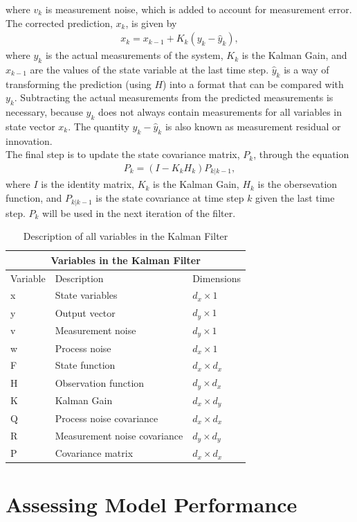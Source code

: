 \begin{enumerate}
    where $v_k$ is measurement noise, which is added to account for measurement error.
    The corrected prediction, $x_k$, is given by
    \begin{align*} 
        x_k = x_{k - 1} + K_k(y_k - \hat y_{k}),
    \end{align*}
   where  $y_k$ is the actual measurements of the system, $K_k$ is the Kalman Gain, and $x_{k-1}$ are the values of the state variable at the last time step. $\hat y_k$ is a way of transforming the prediction (using $H$) into a format that can be compared with $y_k$. Subtracting the actual measurements from the predicted measurements is necessary, because $y_k$ does not always contain measurements for all variables in state vector $x_k$. The quantity $y_k - \hat y_{k}$ is also known as measurement residual or innovation.  \\
   
      The final step is to update the state covariance matrix, $P_k $, through the equation
    \begin{align*} 
        P_k = (I - K_k H_k) P_{k | k-1},
    \end{align*}
    where $I$ is the identity matrix, $K_k$ is the Kalman Gain, $H_k$ is the obersevation function, and $P_{k|k-1}$ is the state covariance at time step $k$ given the last time step. $ P_k $ will be used in the next iteration of the filter.
\end{enumerate} 


\newpage

\begin{center}
\begin{table}
\centering
\caption{Description of all variables in the Kalman Filter} \label{tab:sometab}
\begin{tabular}{ |p{2cm}||p{5cm}|p{2cm}| }
    \hline
    \multicolumn{3}{|c|}{Variables in the Kalman Filter } \\ 
    \hline
    Variable & Description & Dimensions \\
    \hline
    x & State variables  & $d_x \times 1$ \\
    y & Output vector  & $d_y \times 1$ \\
    v & Measurement noise & $d_y \times 1$\\
    w & Process noise & $d_x \times 1$\\
    F & State function  & $d_x \times d_x $  \\ 
    H & Observation function & $d_y \times d_x$\\
    K & Kalman Gain  & $d_x \times d_y$\\
    Q & Process noise covariance  & $d_x \times d_x$ \\
    R & Measurement noise covariance &  $d_y \times d_y$\\
    P & Covariance matrix & $d_x \times d_x $  \\ 
    
    \hline
\end{tabular}

\end{table}
\end{center} 

\newpage

\section{Assessing Model Performance}



